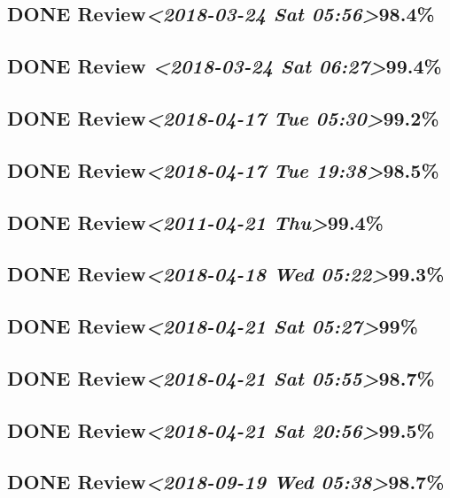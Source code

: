 \documentclass[11pt]{ctexart}
\begin{document}
\subsection{{\bfseries\sffamily DONE} Review\textit{<2018-03-24 Sat 05:56>}98.4\%}
\label{sec:org6393338}
\subsection{{\bfseries\sffamily DONE} Review \textit{<2018-03-24 Sat 06:27>}99.4\%}
\label{sec:org7663774}
\subsection{{\bfseries\sffamily DONE} Review\textit{<2018-04-17 Tue 05:30>}99.2\%}
\label{sec:org9039ac0}
\subsection{{\bfseries\sffamily DONE} Review\textit{<2018-04-17 Tue 19:38>}98.5\%}
\label{sec:org4a5a341}
\subsection{{\bfseries\sffamily DONE} Review\textit{<2011-04-21 Thu>}99.4\%}
\label{sec:org4e1be4b}
\subsection{{\bfseries\sffamily DONE} Review\textit{<2018-04-18 Wed 05:22>}99.3\%}
\label{sec:org0e1e592}
\subsection{{\bfseries\sffamily DONE} Review\textit{<2018-04-21 Sat 05:27>}99\%}
\label{sec:org58316e5}
\subsection{{\bfseries\sffamily DONE} Review\textit{<2018-04-21 Sat 05:55>}98.7\%}
\label{sec:org56046dc}
\subsection{{\bfseries\sffamily DONE} Review\textit{<2018-04-21 Sat 20:56>}99.5\%}
\label{sec:org67040eb}
\subsection{{\bfseries\sffamily DONE} Review\textit{<2018-09-19 Wed 05:38>}98.7\%}
\label{sec:org2c75f43}
\end{document}

